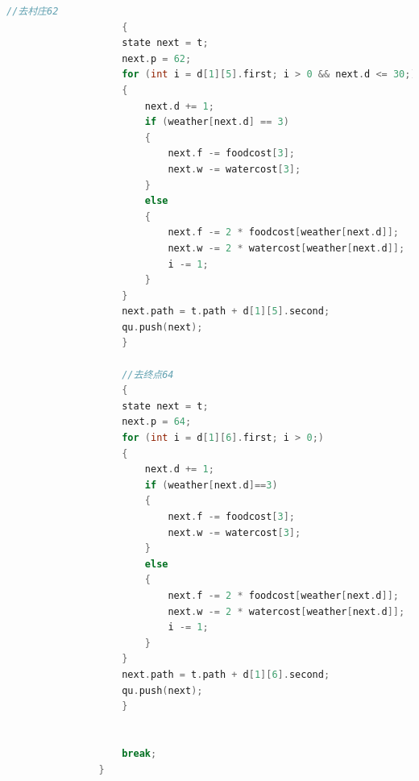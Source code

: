 \documentclass[withoutpreface,bwprint]{cumcmthesis} %
\begin{document}
\begin{appendices}
\begin{lstlisting}[language=c++]
                    //去村庄62
                    {
                    state next = t;
                    next.p = 62;
                    for (int i = d[1][5].first; i > 0 && next.d <= 30;)
                    {
                        next.d += 1;
                        if (weather[next.d] == 3)
                        {
                            next.f -= foodcost[3];
                            next.w -= watercost[3];
                        }
                        else
                        {
                            next.f -= 2 * foodcost[weather[next.d]];
                            next.w -= 2 * watercost[weather[next.d]];
                            i -= 1;
                        }
                    }
                    next.path = t.path + d[1][5].second;
                    qu.push(next);
                    }
                    
                    //去终点64
                    {
                    state next = t;
                    next.p = 64;
                    for (int i = d[1][6].first; i > 0;)
                    {
                        next.d += 1;
                        if (weather[next.d]==3)
                        {
                            next.f -= foodcost[3];
                            next.w -= watercost[3];
                        }
                        else
                        {
                            next.f -= 2 * foodcost[weather[next.d]];
                            next.w -= 2 * watercost[weather[next.d]];
                            i -= 1;
                        }
                    }
                    next.path = t.path + d[1][6].second;
                    qu.push(next);
                    }
                    
    
                    break;
                }
    

\end{lstlisting}
\end{appendices}
\end{document}
